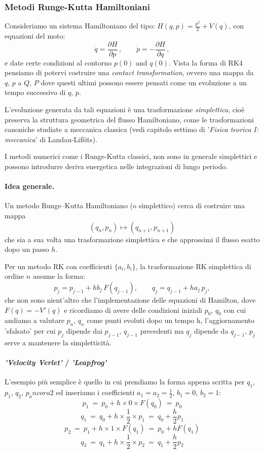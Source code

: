 \documentclass{article}
\begin{document}
	\subsubsection{Metodi Runge-Kutta Hamiltoniani}
	
	Consideriamo un sistema Hamiltoniano del tipo: $\boxed{H(q,p) = \displaystyle\frac{p^2}{2} + V(q)}$, con equazioni del moto:
	\[
	\dot{q} = \frac{\partial H}{\partial p}\, , \qquad
	\dot{p} = -\frac{\partial H}{\partial q}\, ,
	\]
	e date certe condizioni al contorno $p(0)$ and $q(0)$. Vista la forma di RK4 pensiamo di potervi costruire una \emph{contact transformation}, ovvero una mappa da $q,\, p$ a $Q,\, P$ dove questi ultimi possono essere pensati come un evoluzione a un tempo successivo di $q,\, p$.
	
	
	L'evoluzione generata da tali equazioni è una trasformazione \emph{simplettica},
	cioè preserva la struttura geometrica del flusso Hamiltoniano, come le trasformazioni canoniche studiate a meccanica classica (vedi capitolo settimo di '\emph{Fisica teorica I: meccanica}' di Landau-Lif\v{s}its). 
	
	I metodi numerici come i Runge-Kutta classici, non sono in generale
	simplettici e possono introdurre deriva energetica nelle integrazioni di lungo periodo.
	
	\paragraph{Idea generale.}
	Un metodo Runge--Kutta Hamiltoniano (o simplettico) cerca di costruire una mappa
	\[
	(q_n,p_n) \longmapsto (q_{n+1},p_{n+1})
	\]
	che sia a sua volta una trasformazione simplettica e che approssimi il flusso
	esatto dopo un passo $h$.
	
	Per un metodo RK con coefficienti $\{a_i,b_i\}$, la trasformazione RK simplettica di ordine $n$ assume la forma:
	\[
	p_{j} = p_{j-1} + h b_j\, F(q_{j-1}), \qquad
	q_{j} = q_{j-1} + h a_j\, p_j,
	\]
	che non sono nient'altro che l'implementazione delle equazioni di Hamilton, dove $F(q) = -V'(q)$ e ricordiamo di avere delle condizioni iniziali $p_0$, $q_0$ con cui andiamo a valutare $p_n$, $q_n$ come punti evoluti dopo un tempo h, l'aggiornamento 'sfalsato' per cui $p_{j}$ dipende dai $p_{j-1},\, q_{j-1}$ precedenti ma $q_j$ dipende da $q_{j-1},\, p_j$  serve a mantenere la simpletticità.
	
	\paragraph{\emph{'Velocity Verlet'} / \emph{'Leapfrog'}}
	L'esempio più semplice è quello in cui prendiamo la forma appena scritta per $q_1$, $p_1$, $q_2$, $p_ancora2$ ed inseriamo i coefficienti $a_1=a_2=\frac{1}{2}$, $b_1=0$, $b_2=1$:
	\[p_1\ =\ p_0 + h \times 0 \times F(q_0)\ =\ p_0\]
	\[q_1\ =\ q_0 + h\times \frac{1}{2} \times p_1\ =\ q_0 + \frac{h}{2}p_1\]
	\[p_2\ =\ p_1 + h \times 1 \times F(q_1)\ =\ p_0 + hF(q_1) \]
	\[q_2\ =\ q_1 + h\times \frac{1}{2} \times p_2\ =\ q_1 + \frac{h}{2}p_2\]
	
\end{document}
